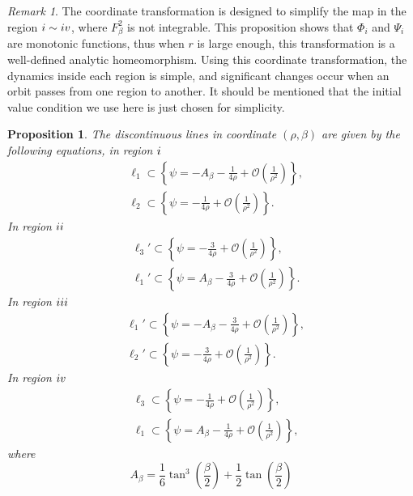 \documentclass{article}
\def \Rone{\uppercase\expandafter{\romannumeral1}}
\def \Rtwo{\uppercase\expandafter{\romannumeral2}}
\def \Rthree{\uppercase\expandafter{\romannumeral3}}
\def \Rfour{\uppercase\expandafter{\romannumeral4}}
\numberwithin{figure}{section}
\numberwithin{equation}{section}
\newtheorem{proposition}[lemma]{Proposition}
\theoremstyle{remark}
\newtheorem*{remark}{Remark}
\theoremstyle{definition}
\begin{document}
\begin{remark}
	The coordinate transformation is designed to simplify the map in the region $\Rone \sim \Rfour$, where $F_\beta^2$ is not integrable. This proposition shows that $\Phi_i$ and $\Psi_i$ are monotonic functions, thus when $r$ is large enough, this transformation is a well-defined analytic homeomorphism. Using this coordinate transformation, the dynamics inside each region is simple, and significant changes occur when an orbit passes from one region to another. It should be mentioned that the initial value condition we use here is just chosen for simplicity.
\end{remark}

\begin{proposition}\label{disc_lines}
	The discontinuous lines in coordinate $(\rho, \beta)$ are given by the following equations, in region $\Rone$
	\begin{equation}\label{region1}
		\begin{split}
			&\ell_1 \subset\left\{\psi=-A_\beta-\frac{1}{4\rho}+\mathcal{O}\left(\frac{1}{\rho^2}\right)\right\},\\
			&\ell_{2}\subset\left\{\psi=-\frac{1}{4\rho}+\mathcal{O}\left(\frac{1}{\rho^2}\right)\right\}.
		\end{split}
	\end{equation}
	In region $\Rtwo$
	\begin{equation}\label{region2}
		\begin{split}
			&\ell_{3}'\subset\left\{\psi=-\frac{3}{4\rho}+\mathcal{O}\left(\frac{1}{\rho^2}\right)\right\},\\
			&\ell_1' \subset\left\{\psi=A_\beta-\frac{3}{4\rho}+\mathcal{O}\left(\frac{1}{\rho^2}\right)\right\}.
		\end{split}
	\end{equation}
	In region $\Rthree$
	\begin{equation}\label{region3}
		\begin{split}
			&\ell_1' \subset\left\{\psi=-A_\beta-\frac{3}{4\rho}+\mathcal{O}\left(\frac{1}{\rho^2}\right)\right\},\\
			&\ell_2'\subset\left\{\psi=-\frac{3}{4\rho}+\mathcal{O}\left(\frac{1}{\rho^2}\right)\right\}.
		\end{split}
	\end{equation}
	In region $\Rfour$
	\begin{equation}\label{region4}
		\begin{split}
			&\ell_3\subset\left\{\psi=-\frac{1}{4\rho}+\mathcal{O}\left(\frac{1}{\rho^2}\right)\right\},\\
			&\ell_1 \subset\left\{\psi=A_\beta-\frac{1}{4\rho}+\mathcal{O}\left(\frac{1}{\rho^2}\right)\right\},
		\end{split}
	\end{equation}
	where 
	$$A_\beta=\frac{1}{6}\tan^3\left(\frac{\beta}{2}\right)+\frac{1}{2}\tan\left(\frac{\beta}{2}\right)$$
\end{proposition}
\end{document}
